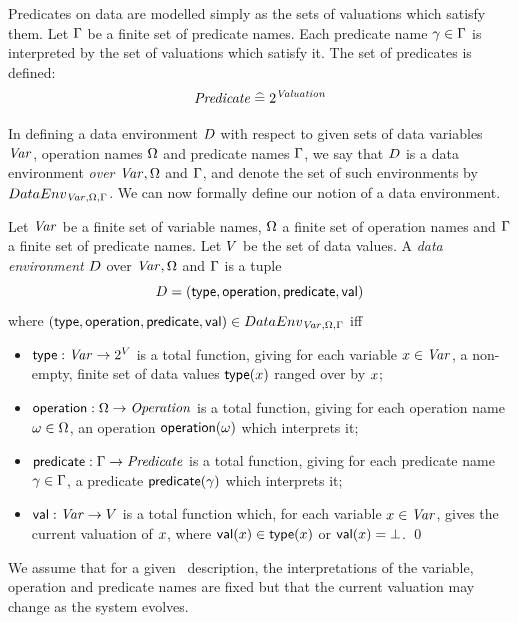 Predicates on data are modelled simply as the sets of valuations which
satisfy them.  Let $\Gamma$ be a finite set of predicate names.  Each
predicate name $\gamma \in \Gamma$ is interpreted by the set of valuations
which satisfy it. The set of predicates is defined:
\[ {\text{\it Predicate\/}} \mathrel{\widehat=} 2^{\text{\it Valuation\/}} \]

In defining a data environment ${D}$ with respect to given sets of
data variables ${\text{\it Var\/}}$, operation names $\Omega$ and predicate names
$\Gamma$, we say that ${D}$ is a data environment \emph{over} ${\text{\it Var\/}}, \Omega$ and
$\Gamma$, and denote the set of such environments by ${DataEnv_{{\text{\it Var\/}},\Omega,\Gamma}}$.
We can now formally define our notion of a data environment.
\begin{definition}
Let ${\text{\it Var\/}}$ be a finite set of variable names, $\Omega$ a finite set of
operation names and $\Gamma$ a finite set of predicate names. Let $V$ be
the set of data values. A \emph{data environment} ${D}$ over
${\text{\it Var\/}}, \Omega$ and $\Gamma$ is a tuple
\[ {D} = (\mathop{\sf type}, \mathop{\sf operation}, \mathop{\sf predicate}, {\mathop{\sf val}}) \]
where $(\mathop{\sf type}, \mathop{\sf operation}, \mathop{\sf predicate}, {\mathop{\sf val}}) \in {DataEnv_{{\text{\it Var\/}},\Omega,\Gamma}}$ iff
\begin{itemize}
\item $\mathop{\sf type} : {\text{\it Var\/}} \rightarrow 2^V$ is a total function, giving for each variable 
 $x \in {\text{\it Var\/}}$, a non-empty, finite set of data values $\mathop{\sf type}(x)$
 ranged over by $x$;
\item $\mathop{\sf operation} : \Omega \rightarrow {\text{\it Operation\/}}$ is a total function, giving for 
  each operation name $\omega \in \Omega$, an operation
  $\mathop{\sf operation}(\omega)$ which interprets it;
\item $\mathop{\sf predicate} : \Gamma \rightarrow {\text{\it Predicate\/}}$ is a total function, giving for each 
  predicate name $\gamma \in \Gamma$, a predicate $\mathop{\sf predicate}(\gamma)$ which interprets 
  it;  
\item ${\mathop{\sf val}} : {\text{\it Var\/}} \rightarrow V$ is a total function which, for each variable 
  $x \in {\text{\it Var\/}}$, gives the current valuation of $x$, where ${\mathop{\sf val}}(x)
  \in \mathop{\sf type}(x)$ or ${\mathop{\sf val}}(x) = \bot$.
\qed
\end{itemize}
\end{definition}

We assume that for a given \bcandle\ description, the interpretations
of the variable, operation and predicate names are fixed but that the
current valuation may change as the system evolves.

